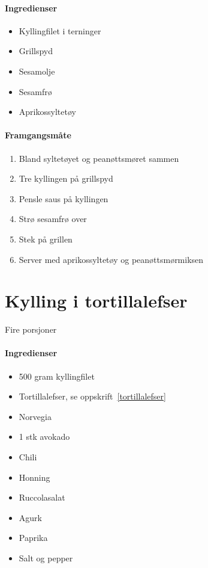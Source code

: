 \documentclass[12pt,a4paper]{book}
\begin{document}
\paragraph{Ingredienser}
\begin{itemize}[noitemsep]
	\item Kyllingfilet i terninger
	\item Grillspyd
	\item Sesamolje
	\item Sesamfrø
	\item Aprikossyltetøy
\end{itemize}

\paragraph{Framgangsmåte}
\begin{enumerate}[noitemsep]
	\item Bland syltetøyet og peanøttsmøret sammen
	\item Tre kyllingen på grillspyd
	\item Pensle saus på kyllingen
	\item Strø sesamfrø over
	\item Stek på grillen
	\item Server med aprikossyltetøy og peanøttsmørmiksen
\end{enumerate}
\clearpage{}
\clearpage{}\section{﻿Kylling i tortillalefser}
\label{kyllingtortilla}

Fire porsjoner

\paragraph{Ingredienser}
\begin{itemize}[noitemsep]
	\item 500 gram kyllingfilet
		\item Tortillalefser, se oppskrift~\ref{tortillalefser}
		\item Norvegia
		\item 1 stk avokado
		\item Chili
		\item Honning
		\item Ruccolasalat
		\item Agurk
		\item Paprika
		\item Salt og pepper
\end{itemize}
\end{document}
